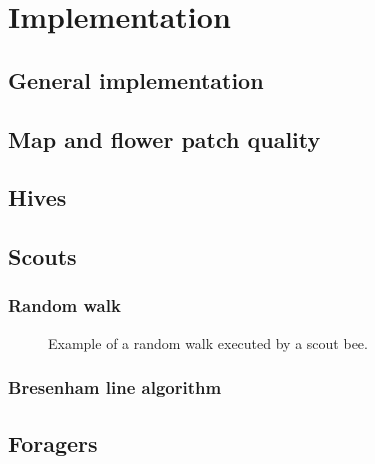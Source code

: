 \section{Implementation}
\subsection{General implementation}
\subsection{Map and flower patch quality}
\subsection{Hives}
\subsection{Scouts}
	\subsubsection{Random walk}
		\begin{figure}
			\centering
			\caption{Example of a random walk executed by a scout bee.}
		\end{figure}
	\subsubsection{Bresenham line algorithm}

\subsection{Foragers}
